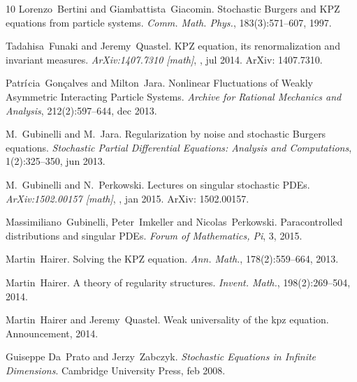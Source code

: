 \documentclass[a4paper,11pt]{article}
\newcommand{\tmtextit}[1]{{\itshape{#1}}}
\begin{document}
\begin{thebibliography}{10}
  Lorenzo~Bertini  and 
  Giambattista~Giacomin.{\newblock} Stochastic Burgers and KPZ equations from
  particle systems.{\newblock} \tmtextit{Comm. Math. Phys.}, 183(3):571--607,
  1997.{\newblock}
  
  Tadahisa~Funaki  and  Jeremy~Quastel.{\newblock}
  KPZ equation, its renormalization and invariant measures.{\newblock}
  \tmtextit{ArXiv:1407.7310 [math]}, , jul 2014.{\newblock} ArXiv:
  1407.7310.{\newblock}
  
  Patr$\acute{\text{{\i}}}$cia~Gon{\c
  c}alves  and  Milton~Jara.{\newblock} Nonlinear Fluctuations of Weakly
  Asymmetric Interacting Particle Systems.{\newblock} \tmtextit{Archive for
  Rational Mechanics and Analysis}, 212(2):597--644, dec 2013.{\newblock}
  
  M.~Gubinelli  and 
  M.~Jara.{\newblock} Regularization by noise and stochastic Burgers
  equations.{\newblock} \tmtextit{Stochastic Partial Differential Equations:
  Analysis and Computations}, 1(2):325--350, jun 2013.{\newblock}
  
  M.~Gubinelli  and 
  N.~Perkowski.{\newblock} Lectures on singular stochastic PDEs.{\newblock}
  \tmtextit{ArXiv:1502.00157 [math]}, , jan 2015.{\newblock} ArXiv:
  1502.00157.{\newblock}
  
  Massimiliano~Gubinelli,
  Peter~Imkeller  and  Nicolas~Perkowski.{\newblock} Paracontrolled
  distributions and singular PDEs.{\newblock} \tmtextit{Forum of Mathematics,
  Pi}, 3, 2015.{\newblock}
  
  Martin~Hairer.{\newblock} Solving the KPZ
  equation.{\newblock} \tmtextit{Ann. Math.}, 178(2):559--664,
  2013.{\newblock}
  
  Martin~Hairer.{\newblock} A theory of
  regularity structures.{\newblock} \tmtextit{Invent. Math.}, 198(2):269--504,
  2014.{\newblock}
  
  Martin~Hairer  and  Jeremy~Quastel.{\newblock}
  Weak universality of the kpz equation.{\newblock} Announcement,
  2014.{\newblock}
  
  Guiseppe Da~Prato  and 
  Jerzy~Zabczyk.{\newblock} \tmtextit{Stochastic Equations in Infinite
  Dimensions}.{\newblock} Cambridge University Press, feb 2008.{\newblock}
  

\end{thebibliography}
\end{document}
